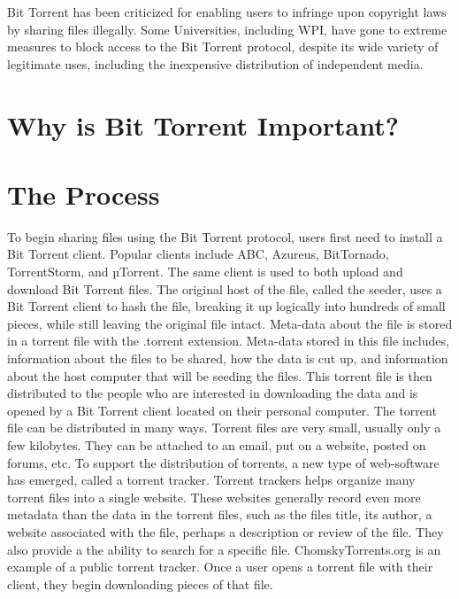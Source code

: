 \documentclass[a4paper,12pt]{report}
\begin{document}
Bit Torrent has been criticized for enabling users to infringe upon copyright laws by sharing files illegally. Some Universities, including WPI, have gone to extreme measures to block access to the Bit Torrent protocol, despite its wide variety of legitimate uses, including the inexpensive distribution of independent media.


\section{Why is Bit Torrent Important?}

\section{The Process}
To begin sharing files using the Bit Torrent protocol, users first need to install a Bit Torrent client.
Popular clients include ABC, Azureus, BitTornado, TorrentStorm, and µTorrent. The same client is used to both upload and download Bit Torrent files.
The original host of the file, called the seeder, uses a Bit Torrent client to hash the file, breaking it up logically into hundreds of small pieces, while still leaving the original file intact.
Meta-data about the file is stored in a torrent file with the .torrent extension.
Meta-data stored in this file includes, information about the files to be shared, how the data is cut up, and information about the host computer that will be seeding the files.
This torrent file is then distributed to the people who are interested in downloading the data and is opened by a Bit Torrent client located on their personal computer.
The torrent file can be distributed in many ways.
Torrent files are very small, usually only a few kilobytes. They can be attached to an email, put on a website, posted on forums, etc.
To support the distribution of torrents, a new type of web-software has emerged, called a torrent tracker.
Torrent trackers helps organize many torrent files into a single website. These websites generally record even more metadata than the data in the torrent files, such as the files title, its author, a website associated with the file, perhaps a description or review of the file.
They also provide a the ability to search for a specific file. ChomskyTorrents.org is an example of a public torrent tracker.
Once a user opens a torrent file with their client, they begin downloading pieces of that file.
\end{document}
